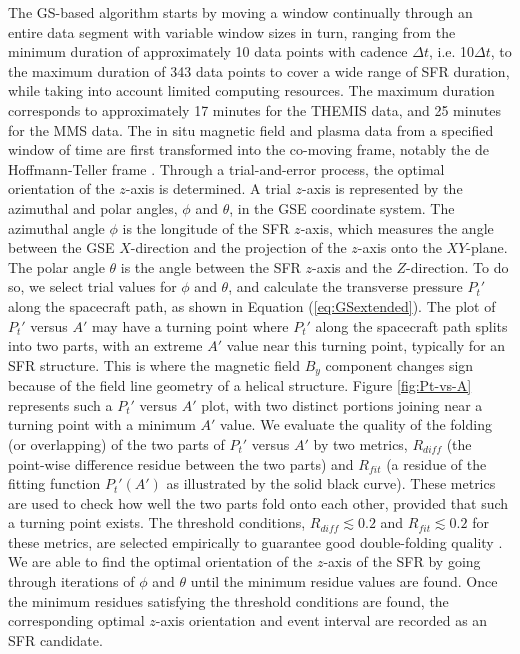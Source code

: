 The GS-based algorithm starts by moving a window continually through an entire data segment with variable window sizes in turn, ranging from the minimum duration of approximately 10 data points with cadence $\Delta t$, i.e. 10$\Delta t$, to the maximum duration of 343 data points to cover a wide range of SFR duration, while taking into account limited computing resources. The maximum duration corresponds to approximately 17 minutes for the THEMIS data, and 25 minutes for the MMS data. The in situ magnetic field and plasma data from a specified window of time are first transformed into the co-moving frame, notably the de Hoffmann-Teller frame \citep{deHoffman-Teller:1950}. Through a trial-and-error process, the optimal orientation of the $z$-axis is determined. A trial $z$-axis is represented by the azimuthal and polar angles, $\phi$ and $\theta$, in the GSE coordinate system. The azimuthal angle $\phi$ is the longitude of the SFR $z$-axis, which measures the angle between the GSE $X$-direction and the projection of the $z$-axis onto the $XY$-plane. The polar angle $\theta$ is the angle between the SFR $z$-axis and the $Z$-direction. To do so, we select trial values for $\phi$ and $\theta$, and calculate the transverse pressure $P_t'$ along the spacecraft path, as shown in Equation (\ref{eq:GSextended}). The plot of $P_t'$ versus $A'$ may have a turning point where $P_t'$ along the spacecraft path splits into two parts, with an extreme $A'$ value near this turning point, typically for an SFR structure. This is where the magnetic field $B_y$ component changes sign because of the field line geometry of a helical structure. Figure \ref{fig:Pt-vs-A} represents such a $P_t'$ versus $A'$ plot, with two distinct portions joining near a turning point with a minimum $A'$ value. We evaluate the quality of the folding (or overlapping) of the two parts of $P_t'$ versus $A'$ by two metrics, $R_{diff}$ (the point-wise difference residue between the two parts) and $R_{fit}$ (a residue of the fitting function $P_t'(A')$ as illustrated by the solid black curve). These metrics are used to check how well the two parts fold onto each other, provided that such a turning point exists. The threshold conditions, $R_{diff}\lesssim 0.2$ and $R_{fit}\lesssim 0.2$ for these metrics, are selected empirically to guarantee good double-folding quality \citep{Hu:2018}. We are able to find the optimal orientation of the $z$-axis of the SFR by going through iterations of $\phi$ and $\theta$ until the minimum residue values are found. Once the minimum residues satisfying the threshold conditions are found, the corresponding optimal $z$-axis orientation and event interval are recorded as an SFR candidate.

